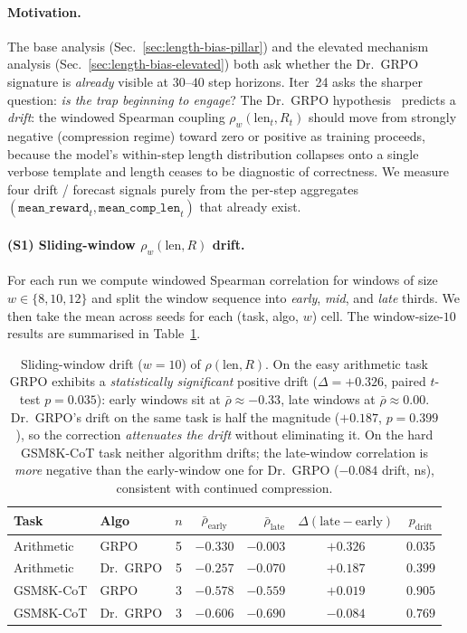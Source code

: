 \paragraph{Motivation.}
The base analysis (Sec.~\ref{sec:length-bias-pillar}) and the
elevated mechanism analysis (Sec.~\ref{sec:length-bias-elevated})
both ask whether the Dr.~GRPO signature is \emph{already} visible
at $30$--$40$ step horizons. Iter~24 asks the sharper question:
\emph{is the trap \emph{beginning} to engage}? The Dr.~GRPO
hypothesis~\cite{tong2025drgrpo} predicts a \emph{drift}: the
windowed Spearman coupling $\rho_w(\mathrm{len}_t, R_t)$ should
move from strongly negative (compression regime) toward zero or
positive as training proceeds, because the model's within-step
length distribution collapses onto a single verbose template and
length ceases to be diagnostic of correctness. We measure four
drift / forecast signals purely from the per-step aggregates
$(\texttt{mean\_reward}_t, \texttt{mean\_comp\_len}_t)$ that
already exist.

\paragraph{(S1) Sliding-window $\rho_w(\mathrm{len}, R)$ drift.}
For each run we compute windowed Spearman correlation for windows
of size $w \in \{8, 10, 12\}$ and split the window sequence into
\emph{early}, \emph{mid}, and \emph{late} thirds. We then take the
mean across seeds for each (task, algo, $w$) cell. The
window-size-$10$ results are summarised in
Table~\ref{tab:length-bias-iter24-drift}.

\begin{table}[htbp]
\centering
\small
\begin{tabular}{llccrcc}
\toprule
Task & Algo & $n$ & $\bar\rho_{\text{early}}$
   & $\bar\rho_{\text{late}}$
   & $\Delta(\text{late}{-}\text{early})$ & $p_{\text{drift}}$ \\
\midrule
Arithmetic   & GRPO     & 5 & $-0.330$ & $-0.003$ & $+0.326$ & $0.035$ \\
Arithmetic   & Dr.~GRPO & 5 & $-0.257$ & $-0.070$ & $+0.187$ & $0.399$ \\
GSM8K-CoT    & GRPO     & 3 & $-0.578$ & $-0.559$ & $+0.019$ & $0.905$ \\
GSM8K-CoT    & Dr.~GRPO & 3 & $-0.606$ & $-0.690$ & $-0.084$ & $0.769$ \\
\bottomrule
\end{tabular}
\caption{Sliding-window drift ($w{=}10$) of $\rho(\mathrm{len}, R)$.
On the easy arithmetic task GRPO exhibits a \emph{statistically
significant} positive drift ($\Delta = +0.326$, paired $t$-test
$p = 0.035$): early windows sit at $\bar\rho \approx -0.33$,
late windows at $\bar\rho \approx 0.00$. Dr.~GRPO's drift on the
same task is half the magnitude ($+0.187$, $p = 0.399$), so the
correction \emph{attenuates the drift} without eliminating it.
On the hard GSM8K-CoT task neither algorithm drifts; the
late-window correlation is \emph{more} negative than the
early-window one for Dr.~GRPO ($-0.084$ drift, ns), consistent
with continued compression.}
\label{tab:length-bias-iter24-drift}
\end{table}

